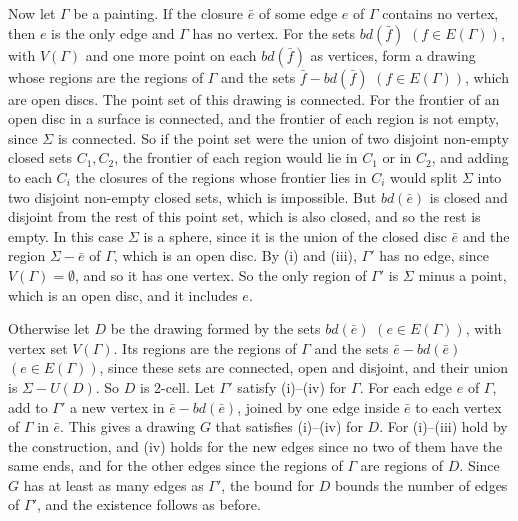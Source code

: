 {Now let $\Gamma$ be a painting. If the closure $\bar{e}$ of some edge $e$ of $\Gamma$ contains no vertex, then $e$ is the only edge and $\Gamma$ has no vertex. For the sets $bd(\bar{f})$ $(f \in E(\Gamma))$, with $V(\Gamma)$ and one more point on each $bd(\bar{f})$ as vertices, form a drawing whose regions are the regions of $\Gamma$ and the sets $\bar{f} - bd(\bar{f})$ $(f \in E(\Gamma))$, which are open discs. The point set of this drawing is connected. For the frontier of an open disc in a surface is connected, and the frontier of each region is not empty, since $\Sigma$ is connected. So if the point set were the union of two disjoint non-empty closed sets $C_1, C_2$, the frontier of each region would lie in $C_1$ or in $C_2$, and adding to each $C_i$ the closures of the regions whose frontier lies in $C_i$ would split $\Sigma$ into two disjoint non-empty closed sets, which is impossible. But $bd(\bar{e})$ is closed and disjoint from the rest of this point set, which is also closed, and so the rest is empty. In this case $\Sigma$ is a sphere, since it is the union of the closed disc $\bar{e}$ and the region $\Sigma - \bar{e}$ of $\Gamma$, which is an open disc. By (i) and (iii), $\Gamma'$ has no edge, since $V(\Gamma) = \emptyset$, and so it has one vertex. So the only region of $\Gamma'$ is $\Sigma$ minus a point, which is an open disc, and it includes $e$.

Otherwise let $D$ be the drawing formed by the sets $bd(\bar{e})$ $(e \in E(\Gamma))$, with vertex set $V(\Gamma)$. Its regions are the regions of $\Gamma$ and the sets $\bar{e} - bd(\bar{e})$ $(e \in E(\Gamma))$, since these sets are connected, open and disjoint, and their union is $\Sigma - U(D)$. So $D$ is 2-cell. Let $\Gamma'$ satisfy (i)--(iv) for $\Gamma$. For each edge $e$ of $\Gamma$, add to $\Gamma'$ a new vertex in $\bar{e} - bd(\bar{e})$, joined by one edge inside $\bar{e}$ to each vertex of $\Gamma$ in $\bar{e}$. This gives a drawing $G$ that satisfies (i)--(iv) for $D$. For (i)--(iii) hold by the construction, and (iv) holds for the new edges since no two of them have the same ends, and for the other edges since the regions of $\Gamma$ are regions of $D$. Since $G$ has at least as many edges as $\Gamma'$, the bound for $D$ bounds the number of edges of $\Gamma'$, and the existence follows as before.

}
